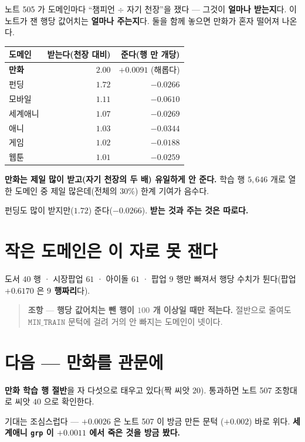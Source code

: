 \documentclass[11pt]{article}
\begin{document}
노트 505 가 도메인마다 ``챔피언 $\div$ 자기 천장''을 쟀다 --- 그것이
\textbf{얼마나 받는지}다. 이 노트가 잰 행당 값어치는 \textbf{얼마나
주는지}다. 둘을 함께 놓으면 만화가 혼자 떨어져 나온다.

\begin{center}
\begin{tabular}{lrr}
\hline
도메인 & 받는다(천장 대비) & 준다(행 만 개당) \\
\hline
\textbf{만화} & $\mathbf{2.00}$ & $\mathbf{+0.0091}$ (해롭다) \\
펀딩 & $1.72$ & $-0.0266$ \\
모바일 & $1.11$ & $-0.0610$ \\
세계애니 & $1.07$ & $-0.0269$ \\
애니 & $1.03$ & $-0.0344$ \\
게임 & $1.02$ & $-0.0188$ \\
웹툰 & $1.01$ & $-0.0259$ \\
\hline
\end{tabular}
\end{center}

\textbf{만화는 제일 많이 받고(자기 천장의 두 배) 유일하게 안 준다.} 학습
행 $5{,}646$ 개로 열한 도메인 중 제일 많은데(전체의 $30\%$) 한계 기여가
음수다.

펀딩도 많이 받지만($1.72$) 준다($-0.0266$). \textbf{받는 것과 주는 것은
따로다.}

\section{작은 도메인은 이 자로 못 잰다}

도서 $40$ 행 · 시장팝업 $61$ · 아이돌 $61$ · 팝업 $9$ 행만 빠져서 행당
수치가 튄다(팝업 $+0.6170$ 은 \textbf{$9$ 행짜리}다).

\begin{quote}
\textbf{조항} --- \textbf{행당 값어치는 뺀 행이 $100$ 개 이상일 때만
적는다.} 절반으로 줄여도 $\texttt{MIN\_TRAIN}$ 문턱에 걸려 거의 안 빠지는
도메인이 넷이다.
\end{quote}

\section{다음 --- 만화를 관문에}

\textbf{만화 학습 행 절반}을 자 다섯으로 태우고 있다(짝 씨앗 $20$).
통과하면 노트 507 조항대로 씨앗 $40$ 으로 확인한다.

기대는 조심스럽다 --- $+0.0026$ 은 노트 507 이 방금 만든 문턱
($+0.002$) 바로 위다. \textbf{세계애니 \texttt{grp} 이 $+0.0011$ 에서
죽은 것을 방금 봤다.}
\end{document}

